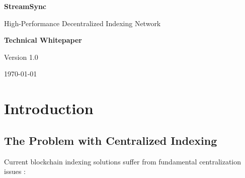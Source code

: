 \documentclass[12pt,a4paper]{article}
\begin{document}
\begin{titlepage}
    \centering
    \vspace*{2cm}

    {\Huge\bfseries\color{primaryblue} StreamSync\par}
    \vspace{0.5cm}
    {\Large High-Performance Decentralized Indexing Network\par}

    \vspace{2cm}

    {\large\textbf{Technical Whitepaper}\par}
    {\large Version 1.0\par}

    \vspace{2cm}

    {\large\today\par}

    \vfill

    \begin{abstract}
        StreamSync introduces a paradigm shift in blockchain data indexing through economic decentralization and competitive node operations. By implementing a novel racing competition mechanism where 3-5 nodes compete for each query, combined with a dual-token economic model, StreamSync delivers guaranteed sub-10ms Solana query performance while eliminating vendor lock-in. This whitepaper presents our technical architecture, token economics, and the innovative approaches that enable unprecedented performance and true decentralization from day one.
    \end{abstract}

\end{titlepage}

\tableofcontents
\newpage

\section{Introduction}

\subsection{The Problem with Centralized Indexing}

Current blockchain indexing solutions suffer from fundamental centralization issues \cite{messari2024, alchemy2023}:
\end{document}

